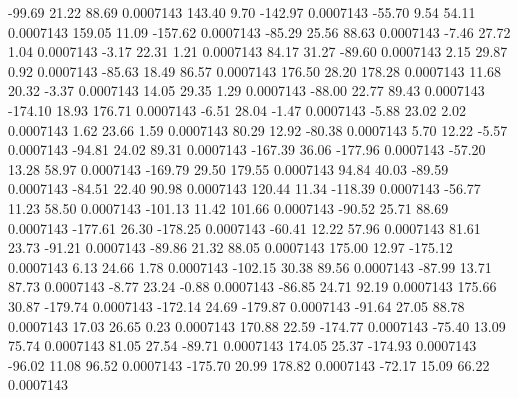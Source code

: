       -99.69       21.22       88.69     0.0007143
      143.40        9.70     -142.97     0.0007143
      -55.70        9.54       54.11     0.0007143
      159.05       11.09     -157.62     0.0007143
      -85.29       25.56       88.63     0.0007143
       -7.46       27.72        1.04     0.0007143
       -3.17       22.31        1.21     0.0007143
       84.17       31.27      -89.60     0.0007143
        2.15       29.87        0.92     0.0007143
      -85.63       18.49       86.57     0.0007143
      176.50       28.20      178.28     0.0007143
       11.68       20.32       -3.37     0.0007143
       14.05       29.35        1.29     0.0007143
      -88.00       22.77       89.43     0.0007143
     -174.10       18.93      176.71     0.0007143
       -6.51       28.04       -1.47     0.0007143
       -5.88       23.02        2.02     0.0007143
        1.62       23.66        1.59     0.0007143
       80.29       12.92      -80.38     0.0007143
        5.70       12.22       -5.57     0.0007143
      -94.81       24.02       89.31     0.0007143
     -167.39       36.06     -177.96     0.0007143
      -57.20       13.28       58.97     0.0007143
     -169.79       29.50      179.55     0.0007143
       94.84       40.03      -89.59     0.0007143
      -84.51       22.40       90.98     0.0007143
      120.44       11.34     -118.39     0.0007143
      -56.77       11.23       58.50     0.0007143
     -101.13       11.42      101.66     0.0007143
      -90.52       25.71       88.69     0.0007143
     -177.61       26.30     -178.25     0.0007143
      -60.41       12.22       57.96     0.0007143
       81.61       23.73      -91.21     0.0007143
      -89.86       21.32       88.05     0.0007143
      175.00       12.97     -175.12     0.0007143
        6.13       24.66        1.78     0.0007143
     -102.15       30.38       89.56     0.0007143
      -87.99       13.71       87.73     0.0007143
       -8.77       23.24       -0.88     0.0007143
      -86.85       24.71       92.19     0.0007143
      175.66       30.87     -179.74     0.0007143
     -172.14       24.69     -179.87     0.0007143
      -91.64       27.05       88.78     0.0007143
       17.03       26.65        0.23     0.0007143
      170.88       22.59     -174.77     0.0007143
      -75.40       13.09       75.74     0.0007143
       81.05       27.54      -89.71     0.0007143
      174.05       25.37     -174.93     0.0007143
      -96.02       11.08       96.52     0.0007143
     -175.70       20.99      178.82     0.0007143
      -72.17       15.09       66.22     0.0007143
